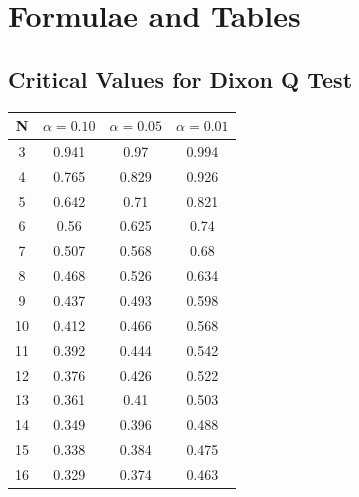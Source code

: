 \documentclass[a4paper,12pt]{article}
\begin{document}
\newpage


\section*{Formulae and Tables}
\subsection*{Critical Values for Dixon Q Test}
{
	\Large
	\begin{center}
		\begin{tabular}{|c|c|c|c|}
			\hline  N  & $\alpha=0.10$  & $\alpha=0.05$  & $\alpha=0.01$  \\ \hline
			3  & 0.941 & 0.97  & 0.994 \\ \hline
			4  & 0.765 & 0.829 & 0.926 \\ \hline
			5  & 0.642 & 0.71  & 0.821 \\ \hline
			6  & 0.56  & 0.625 & 0.74  \\ \hline
			7  & 0.507 & 0.568 & 0.68  \\ \hline
			8  & 0.468 & 0.526 & 0.634 \\ \hline
			9  & 0.437 & 0.493 & 0.598 \\ \hline
			10 & 0.412 & 0.466 & 0.568 \\ \hline
			11 & 0.392 & 0.444 & 0.542 \\ \hline
			12 & 0.376 & 0.426 & 0.522 \\ \hline
			13 & 0.361 & 0.41  & 0.503 \\ \hline
			14 & 0.349 & 0.396 & 0.488 \\ \hline
			15 & 0.338 & 0.384 & 0.475 \\ \hline
			16 & 0.329 & 0.374 & 0.463 \\ \hline
		\end{tabular} 
	\end{center}
}
\end{document}
